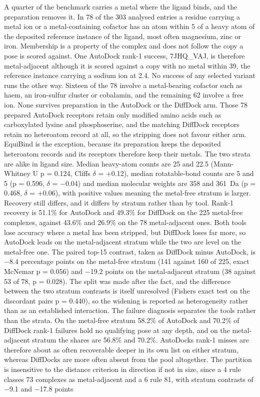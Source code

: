 A quarter of the benchmark carries a metal where the ligand binds, and the preparation removes it. In 78 of the 303 analysed entries a residue carrying a metal ion or a metal-containing cofactor has an atom within 5\angstrom{} of a heavy atom of the deposited reference instance of the ligand, most often magnesium, zinc or iron. Membership is a property of the complex and does not follow the copy a pose is scored against. One AutoDock rank-1 success, 7JHQ\_VAJ, is therefore metal-adjacent although it is scored against a copy with no metal within 39\angstrom{}, the reference instance carrying a sodium ion at 2.4\angstrom{}. No success of any selected variant runs the other way. Sixteen of the 78 involve a metal-bearing cofactor such as haem, an iron-sulfur cluster or cobalamin, and the remaining 62 involve a free ion. None survives preparation in the AutoDock or the DiffDock arm. Those 78 prepared AutoDock receptors retain only modified amino acids such as carboxylated lysine and phosphoserine, and the matching DiffDock receptors retain no heteroatom record at all, so the stripping does not favour either arm. EquiBind is the exception, because its preparation keeps the deposited heteroatom records and its receptors therefore keep their metals. The two strata are alike in ligand size. Median heavy-atom counts are 25 and 22.5 (Mann-Whitney U p = 0.124, Cliff\textquotesingle s \ensuremath{\delta} = +0.12), median rotatable-bond counts are 5 and 5 (p = 0.596, \ensuremath{\delta} = \ensuremath{-}0.04) and median molecular weights are 358 and 361~Da (p = 0.468, \ensuremath{\delta} = +0.06), with positive values meaning the metal-free stratum is larger. Recovery still differs, and it differs by stratum rather than by tool. Rank-1 recovery is 51.1\% for AutoDock and 49.3\% for DiffDock on the 225 metal-free complexes, against 43.6\% and 26.9\% on the 78 metal-adjacent ones. Both tools lose accuracy where a metal has been stripped, but DiffDock loses far more, so AutoDock leads on the metal-adjacent stratum while the two are level on the metal-free one. The paired top-15 contrast, taken as DiffDock minus AutoDock, is \ensuremath{-}8.4 percentage points on the metal-free stratum (141 against 160 of 225, exact McNemar p = 0.056) and \ensuremath{-}19.2 points on the metal-adjacent stratum (38 against 53 of 78, p = 0.028). The split was made after the fact, and the difference between the two stratum contrasts is itself unresolved (Fisher\textquotesingle s exact test on the discordant pairs p = 0.440), so the widening is reported as heterogeneity rather than as an established interaction. The failure diagnosis separates the tools rather than the strata. On the metal-free stratum 58.2\% of AutoDock and 70.2\% of DiffDock rank-1 failures hold no qualifying pose at any depth, and on the metal-adjacent stratum the shares are 56.8\% and 70.2\%. AutoDock\textquotesingle s rank-1 misses are therefore about as often recoverable deeper in its own list on either stratum, whereas DiffDock\textquotesingle s are more often absent from the pool altogether. The partition is insensitive to the distance criterion in direction if not in size, since a 4\angstrom{} rule classes 73 complexes as metal-adjacent and a 6\angstrom{} rule 81, with stratum contrasts of \ensuremath{-}9.1 and \ensuremath{-}17.8 points 